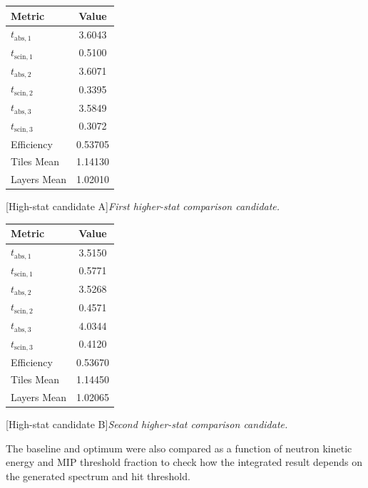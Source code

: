 \begin{center}
    \vspace{0.75cm}

    \begin{minipage}[t]{0.47\textwidth}
        \centering
        \begin{tabular}{lc}
            \toprule
            Metric & Value \\
            \midrule
            $t_{\mathrm{abs},1}$ & 3.6043 \\
            $t_{\mathrm{scin},1}$ & 0.5100 \\
            $t_{\mathrm{abs},2}$ & 3.6071 \\
            $t_{\mathrm{scin},2}$ & 0.3395 \\
            $t_{\mathrm{abs},3}$ & 3.5849 \\
            $t_{\mathrm{scin},3}$ & 0.3072 \\
            Efficiency & 0.53705 \\
            Tiles Mean & 1.14130 \\
            Layers Mean & 1.02010 \\
            \bottomrule
        \end{tabular}
        [High-stat candidate A]{\it First higher-stat comparison candidate.}
        \label{tab:rerun_a_geometry}
    \end{minipage}
    \hfill
    \begin{minipage}[t]{0.47\textwidth}
        \centering
        \begin{tabular}{lc}
            \toprule
            Metric & Value \\
            \midrule
            $t_{\mathrm{abs},1}$ & 3.5150 \\
            $t_{\mathrm{scin},1}$ & 0.5771 \\
            $t_{\mathrm{abs},2}$ & 3.5268 \\
            $t_{\mathrm{scin},2}$ & 0.4571 \\
            $t_{\mathrm{abs},3}$ & 4.0344 \\
            $t_{\mathrm{scin},3}$ & 0.4120 \\
            Efficiency & 0.53670 \\
            Tiles Mean & 1.14450 \\
            Layers Mean & 1.02065 \\
            \bottomrule
        \end{tabular}
        [High-stat candidate B]{\it Second higher-stat comparison candidate.}
        \label{tab:rerun_b_geometry}
    \end{minipage}
\end{center}
\noindent The baseline and optimum were also compared as a function of neutron kinetic energy and MIP threshold fraction to check how the integrated result depends on the generated spectrum and hit threshold.

